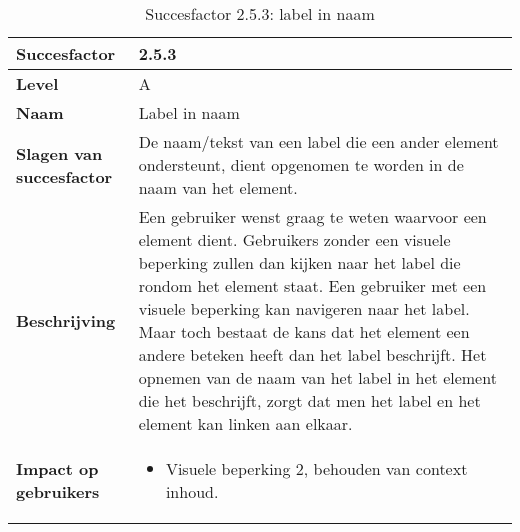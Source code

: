 \begin{table}[H]
    \centering
    \caption{Succesfactor 2.5.3: label in naam}
    
    
    \hspace*{-1cm}\begin{tabular}{|l|p{12cm}|} 
        \hline
        \textbf{Succesfactor}                 & 2.5.3                                                                                                                                                                                                                                                                                                                                                                                                                                                                                                        \\ 
        \hline
        \textbf{Level}                        & A                                                                                                                                                                                                                                                                                                                                                                                                                                                                                                               \\ 
        \hline
        \textbf{Naam}                         & Label in naam~                                                                                                                                                                                                                                                                                                                                                                                                                                                                                      \\ 
        \hline
        \textbf{Slagen van succesfactor}      & De naam/tekst van een label die een ander element ondersteunt, dient opgenomen te worden in de naam van het element.
                                                                                                   \\ 
        \hline
        \textbf{Beschrijving}                 & Een gebruiker wenst graag te weten waarvoor een element dient. Gebruikers zonder een visuele beperking zullen dan kijken naar het label die rondom het element staat. Een gebruiker met een visuele beperking kan navigeren naar het label. Maar toch bestaat de kans dat het element een andere beteken heeft dan het label beschrijft. Het opnemen van de naam van het label in het element die het beschrijft, zorgt dat men het label en het element kan linken aan elkaar.   \\ 
        \hline
        \textbf{Impact op gebruikers}         &  
        \begin{itemize}
            \item Visuele beperking 2, behouden van context inhoud.
            

\end{itemize}
\end{tabular}
\end{table}
